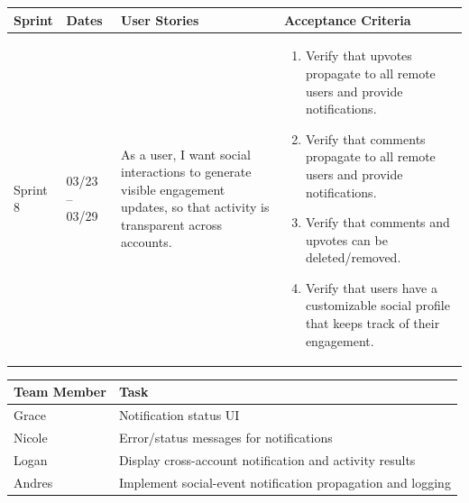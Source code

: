 \documentclass[12pt]{article}
\begin{document}
\noindent
\begin{tabular}{|L{1.2cm}|L{1.8cm}|L{5.2cm}|L{6.3cm}|}
\hline
\textbf{Sprint} & \textbf{Dates} & \textbf{User Stories} & \textbf{Acceptance Criteria} \\
\hline
Sprint 8 & 03/23 -- 03/29 &
As a user, I want social interactions to generate visible engagement updates, so that activity is transparent across accounts. &
\begin{enumerate}
    \item Verify that upvotes propagate to all remote users and provide notifications.
    \item Verify that comments propagate to all remote users and provide notifications.
    \item Verify that comments and upvotes can be deleted/removed.
    \item Verify that users have a customizable social profile that keeps track of their engagement.
\end{enumerate} \\
\hline
\end{tabular}

\vspace{0.5em}

\noindent
\begin{tabular}{|L{2.5cm}|L{12.5cm}|}
\hline
\textbf{Team Member} & \textbf{Task} \\
\hline
Grace & Notification status UI \\
\hline
Nicole & Error/status messages for notifications \\
\hline
Logan & Display cross-account notification and activity results \\
\hline
Andres & Implement social-event notification propagation and logging \\
\hline
\end{tabular}

\vspace{2em}


\vspace{0.5em}
\end{document}
